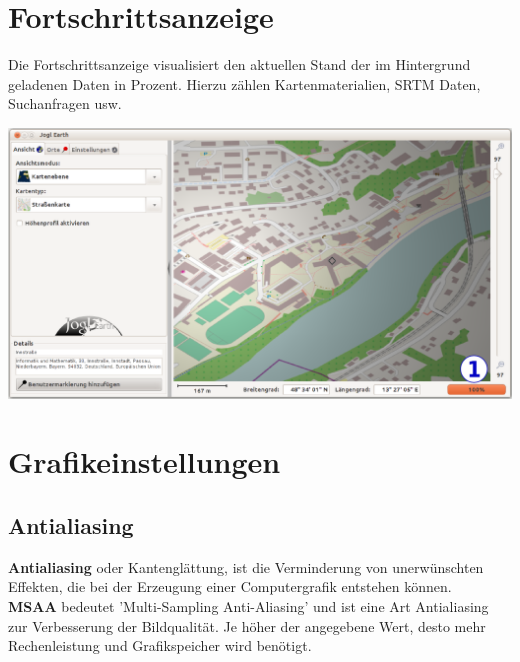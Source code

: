 \documentclass[10pt]{scrreprt}
\begin{document}
\section{Fortschrittsanzeige} 
Die Fortschrittsanzeige  visualisiert den aktuellen Stand der im Hintergrund geladenen Daten in Prozent. Hierzu zählen Kartenmaterialien, SRTM Daten, Suchanfragen usw.

\vspace{3mm}
\begin{center}
\includegraphics[scale=0.31]{images/fortschrittsanzeige.png}
\end{center}


\newpage
\section{Grafikeinstellungen} 

\vspace{3mm}
\subsection{Antialiasing}    

\textbf{Antialiasing} oder Kantenglättung, ist die Verminderung von unerwünschten Effekten, die bei der Erzeugung einer Computergrafik entstehen können.\\

\textbf{MSAA} bedeutet 'Multi-Sampling Anti-Aliasing' und ist eine Art Antialiasing zur Verbesserung der Bildqualität. Je höher der angegebene Wert, desto mehr Rechenleistung und Grafikspeicher wird benötigt.\\
\end{document}
